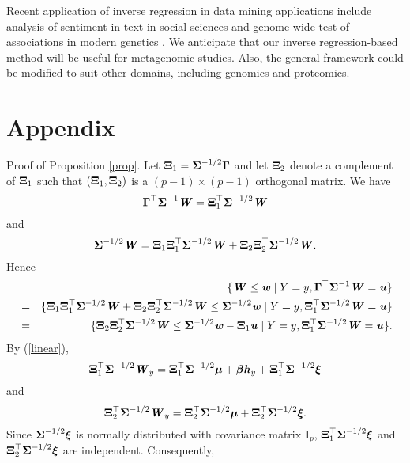 \documentclass[12pt]{article}
\def \bfith{\mbox{\textbf{\textit{h}}}}
\def \bfitu{\mbox{\textbf{\textit{u}}}}
\def \bfitw{\mbox{\textbf{\textit{w}}}}
\def \bfitW{\mbox{\textbf{\textit{W}}}}
\def \bfbeta{\mbox{\boldmath $\beta$}}
\def \bfmu{\mbox{\boldmath $\mu$}}
\def \bfxi{\mbox{\boldmath $\xi$}}
\def \I{\mathbf{I}}
\def \bfGamma{\mbox{\boldmath $\Gamma$}}
\def \bfXi{\mbox{\boldmath $\Xi$}}
\def \bfSigma{\mbox{\boldmath $\Sigma$}}
\begin{document}

Recent application of inverse regression in data mining applications include analysis of sentiment in text in social sciences \citep{taddy2010multinomial} and genome-wide test of associations in modern genetics \citep{song2015testing}. We anticipate that our inverse regression-based method will be useful for metagenomic studies. Also, the general framework could be modified to suit other domains, including genomics and proteomics.

\section{Appendix}

{\sc Proof of Proposition \ref{prop}.} Let $\bfXi_1 = \bfSigma^{-1/2} \bfGamma$ and let $\bfXi_2$ denote a complement of $\bfXi_1$ such that $(\bfXi_1, \bfXi_2)$ is a $(p - 1) \times (p - 1)$ orthogonal matrix. We have
$$\bfGamma^{\top} \bfSigma^{-1} \bfitW = \bfXi_1^{\top} \bfSigma^{-1/2} \bfitW$$
and
$$\bfSigma^{-1/2} \bfitW = \bfXi_1 \bfXi_1^{\top} \bfSigma^{-1/2} \bfitW + \bfXi_2 \bfXi_2^{\top} \bfSigma^{-1/2} \bfitW.$$
Hence
\begin{eqnarray*}
&& \{\bfitW \leq \bfitw \mid Y = y, \bfGamma^{\top} \bfSigma^{-1} \bfitW = \bfitu\} \\
&=& \{\bfXi_1 \bfXi_1^{\top} \bfSigma^{-1/2} \bfitW + \bfXi_2 \bfXi_2^{\top} \bfSigma^{-1/2} \bfitW \leq  \bfSigma^{-1/2} \bfitw \mid Y = y, \bfXi_1^{\top} \bfSigma^{-1/2} \bfitW = \bfitu\} \\
&=& \{\bfXi_2 \bfXi_2^{\top} \bfSigma^{-1/2} \bfitW \leq  \bfSigma^{-1/2} \bfitw - \bfXi_1 \bfitu \mid Y = y, \bfXi_1^{\top} \bfSigma^{-1/2} \bfitW = \bfitu\}.
\end{eqnarray*}
By (\ref{linear}),
\begin{equation*}
\bfXi_1^{\top} \bfSigma^{-1/2} \bfitW_y = \bfXi_1^{\top} \bfSigma^{-1/2} \bfmu + \bfbeta \bfith_y + \bfXi_1^{\top} \bfSigma^{-1/2} \bfxi
\end{equation*}
and
\begin{equation*}
\bfXi_2^{\top} \bfSigma^{-1/2} \bfitW_y =  \bfXi_2^{\top} \bfSigma^{-1/2} \bfmu + \bfXi_2^{\top} \bfSigma^{-1/2} \bfxi.
\end{equation*}
Since $\bfSigma^{-1/2} \bfxi$ is normally distributed with covariance matrix $\I_p$, $\bfXi_1^{\top} \bfSigma^{-1/2} \bfxi$ and $\bfXi_2^{\top} \bfSigma^{-1/2} \bfxi$ are independent. Consequently,
\end{document}
